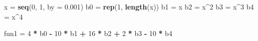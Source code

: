 \documentclass[
]{book}
\newenvironment{Shaded}{\begin{snugshade}}{\end{snugshade}}
\newcommand{\AttributeTok}[1]{\textcolor[rgb]{0.13,0.29,0.53}{#1}}
\newcommand{\DecValTok}[1]{\textcolor[rgb]{0.00,0.00,0.81}{#1}}
\newcommand{\FloatTok}[1]{\textcolor[rgb]{0.00,0.00,0.81}{#1}}
\newcommand{\FunctionTok}[1]{\textcolor[rgb]{0.13,0.29,0.53}{\textbf{#1}}}
\newcommand{\NormalTok}[1]{#1}
\newcommand{\OtherTok}[1]{\textcolor[rgb]{0.56,0.35,0.01}{#1}}
\newcommand{\SpecialCharTok}[1]{\textcolor[rgb]{0.81,0.36,0.00}{\textbf{#1}}}
\begin{document}
\begin{Shaded}
\begin{Highlighting}[]
\NormalTok{x }\OtherTok{=} \FunctionTok{seq}\NormalTok{(}\DecValTok{0}\NormalTok{, }\DecValTok{1}\NormalTok{, }\AttributeTok{by =} \FloatTok{0.001}\NormalTok{)}
\NormalTok{b0 }\OtherTok{=} \FunctionTok{rep}\NormalTok{(}\DecValTok{1}\NormalTok{, }\FunctionTok{length}\NormalTok{(x))}
\NormalTok{b1 }\OtherTok{=}\NormalTok{ x}
\NormalTok{b2 }\OtherTok{=}\NormalTok{ x}\SpecialCharTok{\^{}}\DecValTok{2}
\NormalTok{b3 }\OtherTok{=}\NormalTok{ x}\SpecialCharTok{\^{}}\DecValTok{3}
\NormalTok{b4 }\OtherTok{=}\NormalTok{ x}\SpecialCharTok{\^{}}\DecValTok{4}

\NormalTok{fun1 }\OtherTok{=} \DecValTok{4} \SpecialCharTok{*}\NormalTok{ b0 }\SpecialCharTok{{-}} \DecValTok{10} \SpecialCharTok{*}\NormalTok{ b1 }\SpecialCharTok{+} \DecValTok{16} \SpecialCharTok{*}\NormalTok{ b2 }\SpecialCharTok{+} \DecValTok{2} \SpecialCharTok{*}\NormalTok{ b3 }\SpecialCharTok{{-}} \DecValTok{10} \SpecialCharTok{*}\NormalTok{ b4}


\end{Highlighting}
\end{Shaded}
\end{document}
